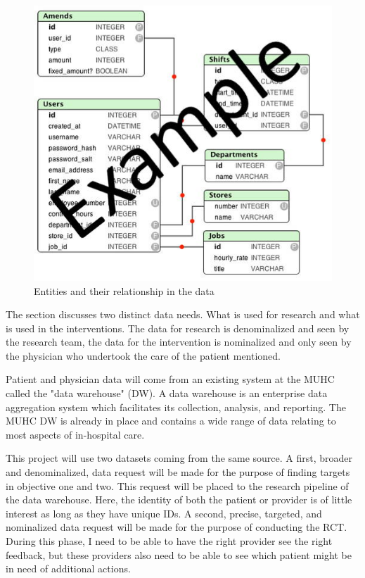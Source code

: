 
\begin{figure}
  \includegraphics[width=\linewidth]{img/example_erd1.jpg}
  \caption{Entities and their relationship in the data}
  \label{fig:entity-relationship-diagram}
\end{figure}

The section discusses two distinct data needs. What is used for research and what is used in the interventions. The data for research is denominalized and seen by the research team, the data for the intervention is nominalized and only seen by the physician who undertook the care of the patient mentioned.

Patient and physician data will come from an existing system at the MUHC called the "data warehouse" (DW). A data warehouse is an enterprise data aggregation system which facilitates its collection, analysis, and reporting. The MUHC DW is already in place and contains a wide range of data relating to most aspects of in-hospital care.

This project will use two datasets coming from the same source. A first, broader and denominalized, data request will be made for the purpose of finding targets in objective one and two. This request will be placed to the research pipeline of the data warehouse. Here, the identity of both the patient or provider is of little interest as long as they have unique IDs. A second, precise, targeted, and nominalized data request will be made for the purpose of conducting the RCT. During this phase, I need to be able to have the right provider see the right feedback, but these providers also need to be able to see which patient might be in need of additional actions.

